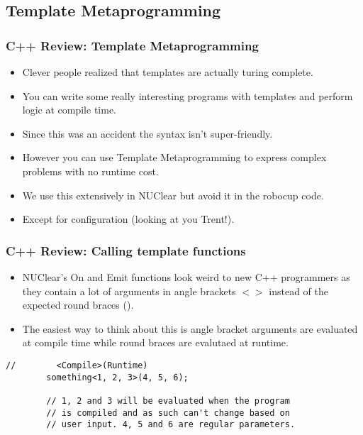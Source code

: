 \documentclass{beamer}
\begin{document}
\subsection{Template Metaprogramming}
\begin{frame}
	\frametitle{C++ Review: Template Metaprogramming}
	\begin{itemize}
		\item Clever people realized that templates are actually turing complete.
		\item You can write some really interesting programs with templates and perform logic at compile time.
		\item Since this was an accident the syntax isn't super-friendly.
		\item However you can use Template Metaprogramming to express complex problems with no runtime cost.
		\item We use this extensively in NUClear but avoid it in the robocup code.
		\item Except for configuration (looking at you Trent!).
	\end{itemize}
\end{frame}

\begin{frame}[fragile]
	\frametitle{C++ Review: Calling template functions}
	\begin{itemize}
		\item NUClear's On and Emit functions look weird to new C++ programmers as they contain a lot of arguments in angle brackets 
			$<>$ instead of the expected round braces ().
		\item The easiest way to think about this is angle bracket arguments are evaluated at compile time while round braces are
			evalutaed at runtime. 
	\end{itemize}

	\begin{lstlisting}[language=nuclear]
		//	      <Compile>(Runtime)
		something<1, 2, 3>(4, 5, 6);

		// 1, 2 and 3 will be evaluated when the program 
		// is compiled and as such can't change based on
		// user input. 4, 5 and 6 are regular parameters.
	\end{lstlisting}
\end{frame}
\end{document}
